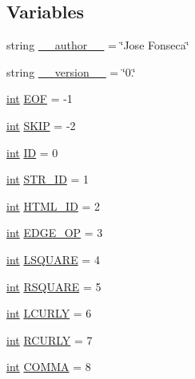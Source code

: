 \subsection*{Variables}
\begin{DoxyCompactItemize}
\item 
string \hyperlink{namespacesmacc__viewer_1_1xdot_1_1xdot_a234165ccf5d9631b02455791198afde7}{\+\_\+\+\_\+author\+\_\+\+\_\+} = \char`\"{}Jose Fonseca\char`\"{}
\item 
string \hyperlink{namespacesmacc__viewer_1_1xdot_1_1xdot_a75be66802b57d9038ac4cfe1c1015d89}{\+\_\+\+\_\+version\+\_\+\+\_\+} = \char`\"{}0.\char`\"{}
\item 
\hyperlink{classint}{int} \hyperlink{namespacesmacc__viewer_1_1xdot_1_1xdot_a7c941e8b870bf032cc630687891e500d}{E\+OF} = -\/1
\item 
\hyperlink{classint}{int} \hyperlink{namespacesmacc__viewer_1_1xdot_1_1xdot_ab0cfdee9b80be3fa9194ccbc99280445}{S\+K\+IP} = -\/2
\item 
\hyperlink{classint}{int} \hyperlink{namespacesmacc__viewer_1_1xdot_1_1xdot_a3df7022e8a60919d6739a3759ac1db56}{ID} = 0
\item 
\hyperlink{classint}{int} \hyperlink{namespacesmacc__viewer_1_1xdot_1_1xdot_a876e4c551a6b7b9b0626a4066e0ce540}{S\+T\+R\+\_\+\+ID} = 1
\item 
\hyperlink{classint}{int} \hyperlink{namespacesmacc__viewer_1_1xdot_1_1xdot_a7ac35a573db8d74083f773b90bba5a52}{H\+T\+M\+L\+\_\+\+ID} = 2
\item 
\hyperlink{classint}{int} \hyperlink{namespacesmacc__viewer_1_1xdot_1_1xdot_a1afa4f3c0a80603cdbdac22dc041eb6f}{E\+D\+G\+E\+\_\+\+OP} = 3
\item 
\hyperlink{classint}{int} \hyperlink{namespacesmacc__viewer_1_1xdot_1_1xdot_a2b49cb9b27785695ca3a4c26204d4464}{L\+S\+Q\+U\+A\+RE} = 4
\item 
\hyperlink{classint}{int} \hyperlink{namespacesmacc__viewer_1_1xdot_1_1xdot_ac588a5ea8d5c206328915ff5c2878e4c}{R\+S\+Q\+U\+A\+RE} = 5
\item 
\hyperlink{classint}{int} \hyperlink{namespacesmacc__viewer_1_1xdot_1_1xdot_adac1d0e0bcfd0d606455d14b3a6bf493}{L\+C\+U\+R\+LY} = 6
\item 
\hyperlink{classint}{int} \hyperlink{namespacesmacc__viewer_1_1xdot_1_1xdot_ae7f67ed6b5533a9668a1eb4e53089aa0}{R\+C\+U\+R\+LY} = 7
\item 
\hyperlink{classint}{int} \hyperlink{namespacesmacc__viewer_1_1xdot_1_1xdot_a48ca5090ff5926c5f4fe59738da40c76}{C\+O\+M\+MA} = 8

\end{DoxyCompactItemize}
